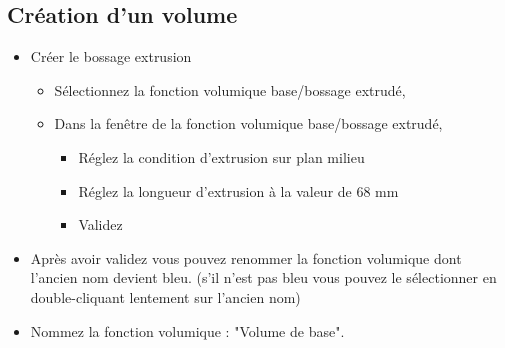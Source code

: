 \subsection{Création d'un volume}

\begin{minipage}{0.75\linewidth}
\begin{itemize}
 \item Créer le bossage extrusion
  \begin{itemize}
  \item Sélectionnez la fonction volumique base/bossage extrudé,
  \item Dans la fenêtre de la fonction volumique base/bossage extrudé,
    \begin{itemize}
    \item Réglez la condition d'extrusion sur plan milieu
    \item Réglez la longueur d'extrusion à la valeur de 68 mm
    \item Validez
    \end{itemize}
  \end{itemize}
 \item Après avoir validez vous pouvez renommer la fonction volumique dont l'ancien nom devient bleu. (s'il n'est pas bleu vous pouvez le sélectionner en double-cliquant lentement sur l'ancien nom)
 \item Nommez la fonction volumique : "Volume de base".
\end{itemize}
\end{minipage}
\hfill
